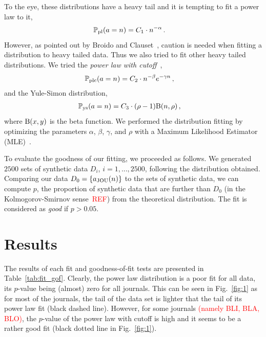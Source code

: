 \documentclass[aps,prl,floatfix,twocolumn]{revtex4-1}
\begin{document}
To the eye, these distributions have a heavy tail and it is tempting to fit a power law to it, 
\begin{align}\label{eq:pl}
 \mathbb{P}_{\rm pl}(a = n) &= C_1\cdot n^{-\alpha}\, .
\end{align}
However, as pointed out by Broido and Clauset~\cite{Bro18}, caution is needed when fitting a distribution to heavy tailed data. 
Thus we also tried to fit other heavy tailed distributions.
We tried the \emph{power law with cutoff}~\cite{Bro18}, 
\begin{align}\label{eq:plco}
 \mathbb{P}_{\rm plc}(a = n) &= C_2\cdot n^{-\beta}e^{-\gamma n}\, ,
\end{align} 
and the Yule-Simon distribution, 
\begin{align}\label{eq:yule}
 \mathbb{P}_{\rm ys}(a = n) &= C_3\cdot (\rho-1){\rm B}(n,\rho)\, ,
\end{align}
where ${\rm B}(x,y)$ is the beta function. 
We performed the distribution fitting by optimizing the parameters $\alpha$, $\beta$, $\gamma$, and $\rho$ with a Maximum Likelihood Estimator (MLE)~\cite{Cla09}. 

To evaluate the goodness of our fitting, we proceeded as follows. 
We generated $2500$ sets of synthetic data $D_i$, $i=1,...,2500$, following the distribution obtained. 
Comparing our data $D_0=\{a_{\rm JOU}(n)\}$ to the sets of synthetic data, we can compute $p$, the proportion of synthetic data that are further than $D_0$ 
(in the Kolmogorov-Smirnov sense~\textcolor{red}{REF}) from the theoretical distribution. 
The fit is considered as \emph{good} if $p>0.05$. 


\section{Results}
The results of each fit and goodness-of-fit tests are presented in Table~\ref{tab:fit_gof}. 
Clearly, the power law distribution is a poor fit for all data, its $p$-value being (almost) zero for all journals. 
This can be seen in Fig.~\ref{fig:1} as for most of the journals, the tail of the data set is lighter that the tail of its power law fit (black dashed line). 
However, for some journals \textcolor{red}{(namely BLI, BLA, BLO)}, the $p$-value of the power law with cutoff is high and it seems to be a rather good fit (black dotted line in Fig.~\ref{fig:1}). 
\end{document}
